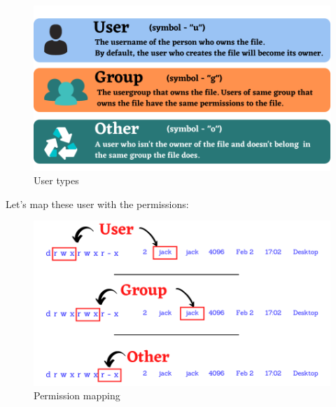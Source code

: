 \setlength{\columnsep}{3pt}
\begin{flushleft}
		
	\begin{figure}[h!]
		\centering
		\includegraphics[scale=0.6]{content/chapter5/images/type_user1.png}
		\caption{User types}
		\label{fig:user_types}
	\end{figure}
	
	Let's map these user with the permissions:
	
	\begin{figure}[h!]
		\centering
		\includegraphics[scale=0.6]{content/chapter5/images/type_user3.png}
		\caption{Permission mapping}
		\label{fig:permission_mapping}
	\end{figure}
	
\end{flushleft}

\newpage


